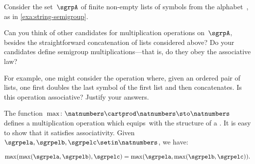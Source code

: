 
\begin{gradedexercise}
    \label{ex:VariationsOnConcatenation}
    \label{ex:alphabet}
    Consider the set~$\sgrpA$ of finite non-empty lists of symbols from the alphabet~\setA, as in \cref{exa:string-semigroup}.

    Can you think of other candidates for multiplication operations on~$\sgrpA$, besides the straightforward concatenation of lists considered above?
    Do your candidates define semigroup multiplications---that is, do they obey the associative law?

    For example, one might consider the operation where, given an ordered pair of lists, one first doubles the last symbol of the first list and then concatenates.
    Is this operation associative?
    Justify your answers.
\end{gradedexercise}

\begin{example}
    \label{max-semigroup}

    The function~$\max \colon \natnumbers \cartprod \natnumbers \sto \natnumbers$ defines a multiplication operation which equips~\natnumbers  with the structure of a .
    It is easy to show that it satisfies associativity.
    Given~$\sgrpela,\sgrpelb,\sgrpelc\setin \natnumbers$, we have:

    \begin{equation}
        \label{eq:max-assoc}
        \max(\max(\sgrpela,\sgrpelb),\sgrpelc)
        =
        \max(\sgrpela,\max(\sgrpelb,\sgrpelc)).
    \end{equation}
\end{example}

